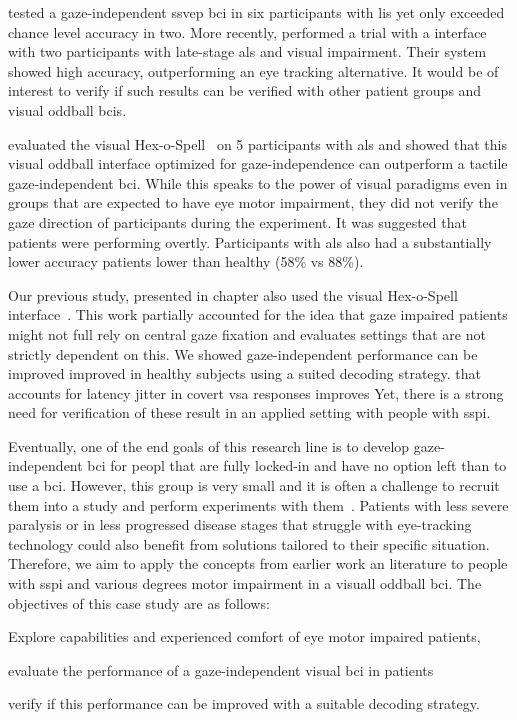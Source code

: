 \textcite{Lesenfants2014} tested a gaze-independent \ac{ssvep} \ac{bci} in six
participants with \ac{lis} yet only exceeded chance level accuracy in two.
More recently, \textcite{Peters2020} performed a trial with a
interface with two participants with late-stage \ac{als} and visual impairment.
Their system showed high accuracy, outperforming an eye tracking alternative.
It would be of interest to verify if such results can be verified with other
patient groups and visual oddball \acp{bci}.

\textcite{Severens2014} evaluated the visual Hex-o-Spell~\cite{Treder2010} on 5
participants with \ac{als} and showed that this visual oddball interface optimized
for gaze-independence can outperform a tactile gaze-independent \ac{bci}.
While this speaks to the power of visual paradigms even in groups that are
expected to have eye motor impairment, they did not verify the gaze direction
of participants during the experiment.
It was suggested that patients were performing overtly.
Participants with \ac{als} also had a substantially lower accuracy patients lower than healthy
(58\% vs 88\%).


Our previous study, presented in chapter  also used the
visual Hex-o-Spell interface~\cite{VanDenKerchove2024}.
This work partially accounted for the idea that gaze impaired patients might
not full rely on central gaze fixation and evaluates settings that are not
strictly dependent on this.
We showed gaze-independent performance can be improved
improved in healthy subjects using a suited decoding strategy.
that accounts for latency jitter in covert \ac{vsa} responses improves
Yet, there is a strong need for verification of these result in an applied
setting with people with \ac{sspi}.


Eventually, one of the end goals of this research line is to develop
gaze-independent \ac{bci} for peopl that are fully locked-in and have no option left than to use a \ac{bci}.
However, this group is very small and it is often a challenge to recruit them
into a study and perform experiments with them~\cite{Wolpaw2006}.
Patients with less severe paralysis or in less progressed disease stages that struggle with
eye-tracking technology could also benefit from
solutions tailored to their specific situation.
Therefore, we aim to apply the concepts from earlier work an literature to
people with \ac{sspi} and various degrees motor impairment in a visuall oddball
\ac{bci}.
The objectives of this case study are as follows:
\begin{enumerate*}
  \item Explore capabilities and experienced comfort of eye motor impaired
    patients,
  \item evaluate the performance of a gaze-independent visual \ac{bci} in patients
  \item verify if this performance can be improved with a suitable decoding
    strategy.
\end{enumerate*}


